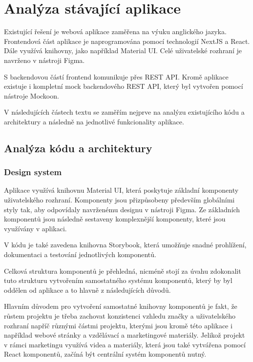 \section{Analýza stávající aplikace}

Existující řešení je webová aplikace zaměřena na výuku anglického jazyka. Frontendová část aplikace je naprogramována pomocí technologií NextJS a React. Dále využívá knihovny, jako například Material UI. Celé uživatelské rozhraní je navrženo v nástroji Figma. %

S backendovou částí frontend komunikuje přes REST API. Kromě aplikace existuje i kompletní mock backendového REST API, který byl vytvořen pomocí nástroje Mockoon. %

V následujících částech textu se zaměřím nejprve na analýzu existujícího kódu a architektury a následně na jednotlivé funkcionality aplikace.

\subsection{Analýza kódu a architektury}


\subsubsection{Design system}

Aplikace využívá knihovnu Material UI, %
která poskytuje základní komponenty uživatelského rozhraní. Komponenty jsou přizpůsobeny především globálními styly tak, aby odpovídaly navrženému designu v nástroji Figma. Ze základních komponentů jsou následně sestaveny komplexnější komponenty, které jsou využívány v aplikaci. 

V kódu je také zavedena knihovna Storybook, která umožňuje snadné prohlížení, dokumentaci a testování jednotlivých komponentů.

Celková struktura komponentů je přehledná, nicméně stojí za úvahu zdokonalit tuto strukturu vytvořením samostatného systému komponentů, který by byl oddělen od aplikace a to hlavně z následujících důvodů.

Hlavním důvodem pro vytvoření samostatné knihovny komponentů je fakt, že růstem projektu je třeba zachovat konzistenci vzhledu značky a uživatelského rozhraní napříč různými částmi projektu, kterými jsou kromě této aplikace i například webové stránky a vzdělávací a marketingové materiály. Jelikož projekt v rámci marketingu využívá videa a materiály, která jsou také vytvářena pomocí React komponentů, začíná být centrální systém komponentů nutný.

